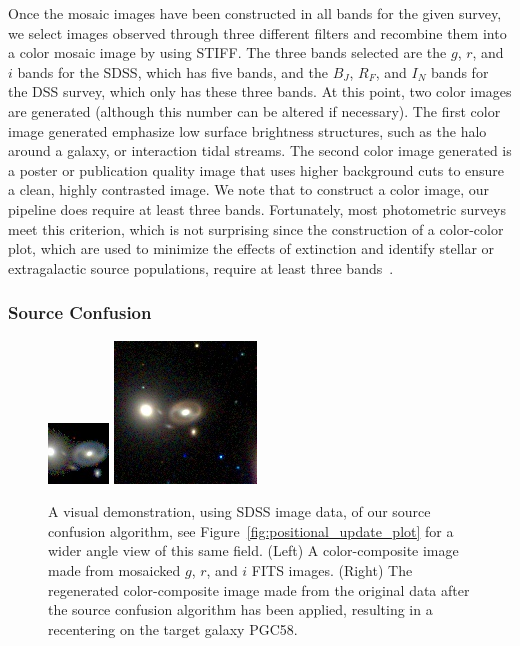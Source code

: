 \documentclass[authoryear, 12pt, 5p, times]{elsarticle}
\begin{document}
Once the mosaic images have been constructed in all bands for the given survey, we select images observed through three different filters and recombine them into a color mosaic image by using STIFF\label{sec:best_low}. The three bands selected are the $g$, $r$, and $i$ bands for the SDSS, which has five bands, and the $B_J$, $R_F$, and $I_N$ bands for the DSS survey, which only has these three bands. At this point, two color images are generated (although this number can be altered if necessary). The first color image generated emphasize low surface brightness structures, such as the halo around a galaxy, or interaction tidal streams. The second color image generated is a poster or publication quality image that uses higher background cuts to ensure a clean, highly contrasted image. We note that to construct a color image, our pipeline does require at least three bands. Fortunately, most photometric surveys meet this criterion, which is not surprising since the construction of a color-color plot, which are used to minimize the effects of extinction and identify stellar or extragalactic source populations, require at least three bands~\citep[see, e.g.,][]{2mass}.

\subsubsection{Source Confusion\label{sec:sc}}

\begin{figure}
\centering
  \includegraphics[width=.225\textwidth]{figures/PGC58b4SC}
  \includegraphics[width=.225\textwidth]{figures/PGC58afterSC}
\caption{ A visual demonstration, using SDSS image data, of our source confusion algorithm, see Figure~\ref{fig:positional_update_plot} for a wider angle view of this same field. (Left) A color-composite image made from mosaicked $g$, $r$, and $i$ FITS images. (Right) The regenerated color-composite image made from the original data after the source confusion algorithm has been applied, resulting in a recentering on the target galaxy PGC58.}
\label{fig:SCdemo}
\end{figure}
\end{document}
